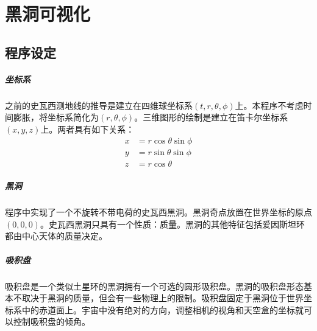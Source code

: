 %
%
%
%
%
%

\chapter{黑洞可视化}

\section{程序设定}
\paragraph{坐标系}
之前的史瓦西测地线的推导是建立在四维球坐标系$\left(t,r,\theta,\phi\right)$上。本程序不考虑时间膨胀，将坐标系简化为$\left(r,\theta,\phi\right)$。三维图形的绘制是建立在笛卡尔坐标系$\left(x,y,z\right)$上。两者具有如下关系：
\begin{equation}
    \begin{split}
        x&=r\cos\theta\sin\phi\\
        y&=r\sin\theta\sin\phi\\
        z&=r\cos\theta
    \end{split}
\end{equation}
\paragraph{黑洞}程序中实现了一个不旋转不带电荷的史瓦西黑洞。黑洞奇点放置在世界坐标的原点$\left(0,0,0\right)$。史瓦西黑洞只具有一个性质：质量。黑洞的其他特征包括爱因斯坦环都由中心天体的质量决定。
\paragraph{吸积盘}吸积盘是一个类似土星环的黑洞拥有一个可选的圆形吸积盘。黑洞的吸积盘形态基本不取决于黑洞的质量，但会有一些物理上的限制。吸积盘固定于黑洞位于世界坐标系中的赤道面上。宇宙中没有绝对的方向，调整相机的视角和天空盒的坐标就可以控制吸积盘的倾角。
